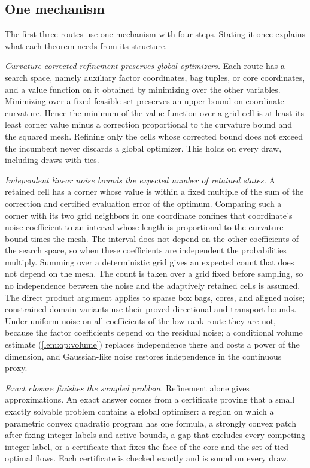 \subsection{One mechanism}\label{sec:intro:mechanism}

The first three routes use one mechanism with four steps. Stating it once
explains what each theorem needs from its structure.

\emph{Curvature-corrected refinement preserves global optimizers.} Each route
has a search space, namely auxiliary factor coordinates, bag tuples, or core
coordinates, and a value function on it obtained by minimizing over the other
variables. Minimizing over a fixed feasible set preserves an upper bound on
coordinate curvature. Hence the minimum of the value function over a grid
cell is at least its least corner value minus a correction proportional to
the curvature bound and the squared mesh. Refining only the cells whose
corrected bound does not exceed the incumbent never discards a global
optimizer. This holds on every draw, including draws with ties.

\emph{Independent linear noise bounds the expected number of retained
states.} A retained cell has a corner whose value is within a fixed multiple
of the sum of the correction and certified evaluation error of the optimum.
Comparing such a corner with its two grid
neighbors in one coordinate confines that coordinate's noise coefficient to
an interval whose length is proportional to the curvature bound times the
mesh. The interval does not depend on the other coefficients of the search
space, so when these coefficients are independent the probabilities
multiply. Summing over a deterministic grid gives an expected count that
does not depend on the mesh. The count is taken over a grid fixed before
sampling, so no independence between the noise and the adaptively retained
cells is assumed. The direct product argument applies to sparse box bags,
cores, and aligned noise; constrained-domain variants use their proved
directional and transport bounds. Under uniform noise on all
coefficients of the low-rank route they are not, because the factor
coefficients depend on the residual noise; a conditional volume estimate
(\cref{lem:qp:volume}) replaces independence there and costs a power of
the dimension, and Gaussian-like noise restores independence in the
continuous proxy.

\emph{Exact closure finishes the sampled problem.} Refinement alone gives
approximations. An exact answer comes from a certificate proving that a
small exactly solvable problem contains a global optimizer: a region on
which a parametric convex quadratic program has one formula, a strongly
convex patch after fixing integer labels and active bounds, a gap that
excludes every competing integer label, or a certificate that fixes the face
of the core and the set of tied optimal flows. Each certificate is checked
exactly and is sound on every draw.

